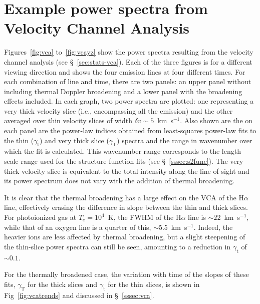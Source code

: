 \documentclass[useAMS,usenatbib]{mn2e}
\newcommand\gammaVCAthin{\ensuremath{\gamma_{\mathrm{t}}}}
\newcommand\gammaVCAvthick{\ensuremath{\gamma_{\mathrm{T}}}}
\begin{document}
\section[]{Example power spectra from Velocity Channel Analysis}
\label{app:vca}
Figures~\ref{fig:vca} to~\ref{fig:vcayz} show the power spectra
resulting from the velocity channel analysis (see
\S~\ref{sec:stats-vca}). Each of the three figures is for a different
viewing direction and shows the four emission lines at four different
times. For each combination of line and time, there are two panels: an
upper panel without including thermal Doppler broadening and a lower
panel with the broadening effects included.  In each graph, two power
spectra are plotted: one representing a very thick velocity slice
(i.e., encompassing all the emission) and the other averaged over thin
velocity slices of width $\delta v \sim 5$~km~s$^{-1}$.  Also shown
are the on each panel are the power-law indices obtained from
least-squares power-law fits to the thin (\gammaVCAthin{}) and very
thick slice (\gammaVCAvthick{})
spectra and the range in wavenumber over which the fit is
calculated. This wavenumber range corresponds to the length-scale
range used for the structure function fits (see
\S~\ref{sssec:s2func}).  The very thick velocity slice is equivalent
to the total intensity along the line of sight and its power spectrum
does not vary with the addition of thermal broadening.

It is clear that the thermal broadening has a large effect on the VCA
of the H$\alpha$ line, effectively erasing the difference in slope
between the thin and thick slices.  For photoionized gas at $T_e=
10^4$~K, the FWHM of the H$\alpha$ line is $\sim 22$~km~s$^{-1}$,
while that of an oxygen line is a quarter of this, $\sim
5.5$~km~s$^{-1}$.  Indeed, the heavier ions are less affected by
thermal broadening, but a slight steepening of the thin-slice power
spectra can still be seen, amounting to a reduction in \gammaVCAthin{}
of \(\sim 0.1\).

For the thermally broadened case, the variation with time of the
slopes of these fits, \gammaVCAvthick{} for the thick slices and
\gammaVCAthin{} for the thin slices, is shown in
Fig~\ref{fig:vcatrends} and discussed in \S~\ref{sssec:vca}.
\end{document}
